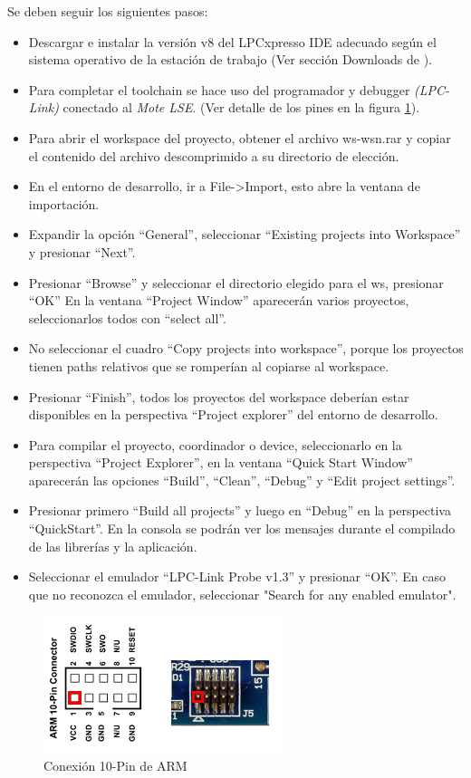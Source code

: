 Se deben seguir los siguientes pasos:
\begin{itemize}
	\item Descargar e instalar la versión v8 del LPCxpresso IDE adecuado según el sistema operativo de la estación de trabajo (Ver sección Downloads de \citep{IDE}).
	\item Para completar el toolchain se hace uso del programador y debugger \textit{(LPC-Link)} conectado al \textit{Mote LSE}. (Ver detalle de los pines en la figura \ref{fig:10pin}).
	\item Para abrir el workspace del proyecto, obtener el archivo ws-wsn.rar y copiar el contenido del archivo descomprimido a su directorio de elección.
	\item En el entorno de desarrollo, ir a File->Import, esto abre la ventana de importación.
	\item Expandir la opción “General”, seleccionar “Existing projects into Workspace” y presionar “Next”.
	\item Presionar “Browse” y seleccionar el directorio elegido para el ws, presionar “OK” En la ventana “Project Window” aparecerán varios proyectos, seleccionarlos todos con “select all”.
	\item No seleccionar el cuadro “Copy projects into workspace”, porque los proyectos tienen paths relativos que se romperían al copiarse al workspace.
	\item Presionar “Finish”, todos los proyectos del workspace deberían estar disponibles en la perspectiva “Project explorer” del entorno de desarrollo.
	\item Para compilar el proyecto, coordinador o device, seleccionarlo en la perspectiva “Project Explorer”, en la ventana “Quick Start Window” aparecerán las opciones “Build”, “Clean”, “Debug” y “Edit project settings”.
	\item Presionar primero “Build all projects” y luego en “Debug” en la perspectiva “QuickStart”. En la consola se podrán ver los mensajes durante el compilado de las librerías y la aplicación.
	\item Seleccionar el emulador “LPC-Link Probe v1.3” y presionar “OK”. En caso que no reconozca el emulador, seleccionar "Search for any enabled emulator".
	\end{itemize}

\begin{figure}[h!]
	\centering
    \includegraphics[width=.5\textwidth]{./Figures/pin.png}
    	\caption{Conexión 10-Pin de ARM}
	\label{fig:10pin}
\end{figure}

